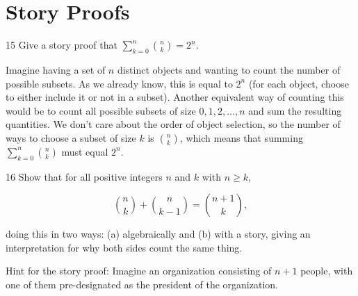 \section{Story Proofs}

\begin{exercise}{15}
    Give a story proof that $\sum_{k=0}^{n} \binom{n}{k} = 2^n$.
\end{exercise}

\begin{solution}
    
    Imagine having a set of $n$ distinct objects and wanting to count the number of possible subsets.
    As we already know, this is equal to $2^n$ (for each object, choose to either include it or not in a subset).
    Another equivalent way of counting this would be to count all possible subsets of size $0, 1, 2, \ldots, n$ and sum the resulting quantities.
    We don't care about the order of object selection, so the number of ways to choose a subset of size $k$ is $\binom{n}{k}$, which means that summing $\sum_{k=0}^{n} \binom{n}{k}$ must equal $2^n$.
\end{solution}

\newpage

\begin{exercise}{16}
    Show that for all positive integers $n$ and $k$ with $n \geq k$,

    \[\binom{n}{k} + \binom{n}{k - 1} = \binom{n + 1}{k},\]

    doing this in two ways: (a) algebraically and (b) with a story, giving an interpretation for why both sides count the same thing.

    Hint for the story proof: Imagine an organization consisting of $n + 1$ people, with one of them pre-designated as the president of the organization.
\end{exercise}

